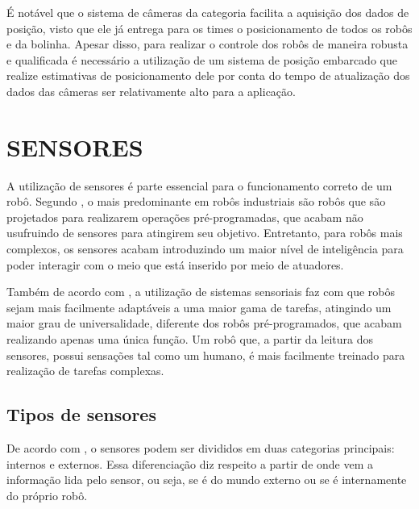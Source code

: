 \documentclass[acronym, symbols, table]{fei}
\begin{document}
			É notável que o sistema de câmeras da categoria  facilita a aquisição dos dados de posição, visto que ele já entrega para os times o posicionamento de todos os robôs e da bolinha. Apesar disso, para realizar o controle dos robôs de maneira robusta e qualificada é necessário a utilização de um sistema de posição embarcado que realize estimativas de posicionamento dele por conta do tempo de atualização dos dados das câmeras ser relativamente alto para a aplicação.

		
	\section{SENSORES} \label{sec:sensores}
	
		A utilização de sensores é parte essencial para o funcionamento correto de um robô. Segundo \textcite{de2017tipos}, o mais predominante em robôs industriais são robôs que são projetados para realizarem operações pré-programadas, que acabam não usufruindo de sensores para atingirem seu objetivo. Entretanto, para robôs mais complexos, os sensores acabam introduzindo um maior nível de inteligência para poder interagir com o meio que está inserido por meio de atuadores.
		
		Também de acordo com \textcite{de2017tipos}, a utilização de sistemas sensoriais faz com que robôs sejam mais facilmente adaptáveis a uma maior gama de tarefas, atingindo um maior grau de universalidade, diferente dos robôs pré-programados, que acabam realizando apenas uma única função. Um robô que, a partir da leitura dos sensores, possui sensações tal como um humano, é mais facilmente treinado para realização de tarefas complexas.
		
		\subsection{Tipos de sensores}		
		
			De acordo com \textcite{sensorFusionKalmanFilter}, o sensores podem ser divididos em duas categorias principais: internos e externos. Essa diferenciação diz respeito a partir de onde vem a informação lida pelo sensor, ou seja, se é do mundo externo ou se é internamente do próprio robô.
			
\end{document}
